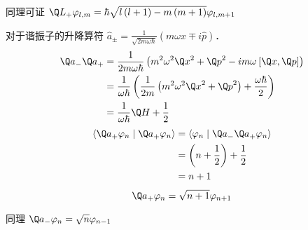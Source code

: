 同理可证 ${\Q L_ + }{\varphi_{l,m}} = \hbar \sqrt {l\left( {l + 1} \right) - m\left( {m + 1} \right)} {\varphi_{l,m + 1}}$ 


对于谐振子的升降算符 ${\hat a_ \pm } = \frac{1}{\sqrt {2m\omega \hbar } }\left( {m\omega \hat x \mp i\hat p} \right)$．   
 \begin{equation}
  \begin{aligned}
  {{\Q a}_ - }{{\Q a}_ + } &= \frac{1}{2m\omega \hbar }\left( {{m^2}{\omega ^2}{{\Q x}^2} + {{\Q p}^2} - im\omega {\kern 1pt} {\kern 1pt} [\Q x,\Q p]} \right) \hfill \\
   &= \frac{1}{\omega \hbar }\left( {\frac{1}{2m}\left( {{m^2}{\omega ^2}{{\Q x}^2} + {{\Q p}^2}} \right) + \frac{\omega \hbar }{2}} \right) \hfill \\
  & = \frac{1}{\omega \hbar }\Q H + \frac12 \hfill \\ 
\end{aligned} 
\end{equation}
 \begin{equation}
  \begin{aligned}
  \left\langle {{{\Q a}_ + }{\varphi_n}}
 \mathrel{\left | {\vphantom {{{{\Q a}_ + }{\varphi_n}} {{{\Q a}_ + }{\varphi_n}}}}
 \right. \kern-\nulldelimiterspace}
 {{{\Q a}_ + }{\varphi_n}} \right\rangle  &= \left\langle {\varphi_n}
 \mathrel{\left | {\vphantom {{\varphi_n} {{{\Q a}_ - }{{\Q a}_ + }{\varphi_n}}}}
 \right. \kern-\nulldelimiterspace}
 {{{\Q a}_ - }{{\Q a}_ + }{\varphi_n}} \right\rangle  \hfill \\
  & = \left( {n + \frac12} \right) + \frac12\\
  &= n + 1 \hfill \\ 
\end{aligned} 
\end{equation}
\begin{equation}
  {\Q a_ + }{\varphi_n} = \sqrt {n + 1} {\varphi_{n + 1}}
\end{equation}
 
同理 ${\Q a_ - }{\varphi_n} = \sqrt n {\varphi_{n - 1}}$   

